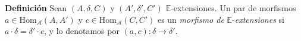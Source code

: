 \documentclass[preview]{standalone}
\begin{document}
\begin{center}
\justifying \textbf{Definición} Sean $(A,\delta,C)$ y $(A',\delta',C')$ $\mathbb{E}$-extensiones. Un par de morfismos $a\in\text{Hom}_\mathscr{A}(A,A')$ y $c\in\text{Hom}_\mathscr{A}(C,C')$ es un \emph{morfismo de} $\mathbb{E}$-\emph{extensiones} si $a\cdot\delta = \delta'\cdot c$, y lo denotamos por $(a,c):\delta\to\delta'$.
\end{center}
\end{document}
